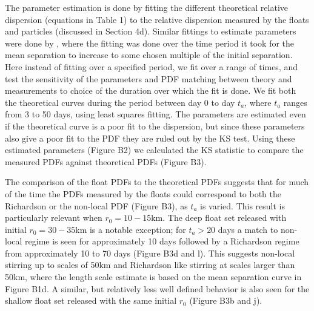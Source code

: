 \documentclass[]{ametsoc}
\begin{document}
The parameter estimation is done by fitting the different theoretical relative dispersion (equations in Table 1) to the relative dispersion measured by the floats and particles (discussed in Section 4d). Similar fittings to estimate parameters were done by \citet{graff2015relative, vera2016}, where the fitting was done over the time period it took for the mean separation to increase to some chosen multiple of the initial separation. Here instead of fitting over a specified period, we fit over a range of times, and test the sensitivity of the parameters and PDF matching between theory and measurements to choice of the duration over which the fit is done. We fit both the theoretical curves during the period between day 0 to day $t_a$, where $t_a$ ranges from 3 to 50 days, using least squares fitting. The parameters are estimated even if the theoretical curve is a poor fit to the dispersion, but since these parameters also give a poor fit to the PDF they are ruled out by the KS test. %
Using these estimated parameters (Figure B2) we calculated the KS statistic to compare the measured PDFs against theoretical PDFs (Figure B3). 

The comparison of the float PDFs to the theoretical PDFs suggests that for much of the time the PDFs measured by the floats could correspond to both the Richardson or the non-local PDF (Figure B3), as $t_a$ is varied. This result is particularly relevant when $r_0=10-15$km. The deep float set released with initial $r_0 = 30-35$km is a notable exception; for $t_a>20$ days a match to non-local regime is seen for approximately 10 days followed by a Richardson regime from approximately 10 to 70 days (Figure B3d and l). This suggests non-local stirring up to scales of 50km and Richardson like stirring at scales larger than 50km, where the length scale estimate is based on the mean separation curve in Figure B1d. A similar, but relatively less well defined behavior is also seen for the shallow float set released with the same initial $r_0$ (Figure B3b and j). 
\end{document}
